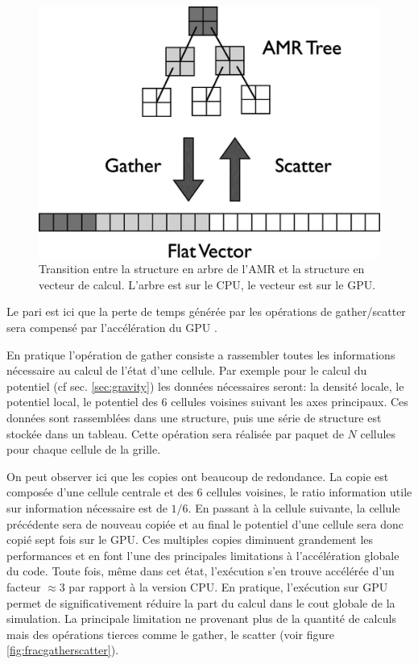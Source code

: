 \begin{figure}
        \includegraphics[width=.95\linewidth]{img/02/gatherscatter.jpg} 
        \caption[Passage AMR / vecteur]{Transition entre la structure en arbre de l'AMR et la structure en vecteur de calcul.
        L'arbre est sur le CPU, le vecteur est sur le GPU.
 		\label{fig:gatherscatter}
 		}
\end{figure}

Le pari est ici que la perte de temps générée par les opérations de gather/scatter sera compensé par l'accélération du \ac{GPU} .

En pratique l'opération de gather consiste a rassembler toutes les informations nécessaire au calcul de l'état d'une cellule.
Par exemple pour le calcul du potentiel (cf sec. \ref{sec:gravity}) les données nécessaires seront: la densité locale, le potentiel local, le potentiel des 6 cellules voisines suivant les axes principaux.
Ces données sont rassemblées dans une structure, puis une série de structure est stockée dans un tableau.
Cette opération sera réalisée par paquet de $N$ cellules pour chaque cellule de la grille.

On peut observer ici que les copies ont beaucoup de redondance.
La copie est composée d'une cellule centrale et des 6 cellules voisines, le ratio information utile sur information nécessaire est de $1/6$.
En passant à la cellule suivante, la cellule précédente sera de nouveau copiée et au final le potentiel d'une cellule sera donc copié sept fois sur le \ac{GPU}.
Ces multiples copies diminuent grandement les performances et en font l'une des principales limitations à l'accélération globale du code.
Toute fois, même dans cet état, l'exécution s'en trouve accélérée d'un facteur $\approx 3$ par rapport à la version \ac{CPU}.
En pratique, l'exécution sur \ac{GPU} permet de significativement réduire la part du calcul dans le cout globale de la simulation.
La principale limitation ne provenant plus de la quantité de calculs mais des opérations tierces comme le gather, le scatter (voir figure \ref{fig:fracgatherscatter}).


